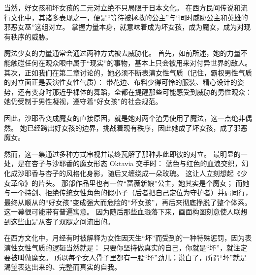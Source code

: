 当然，好女孩和坏女孩的二元对立绝不只局限于日本文化。
在西方民间传说和流行文化中，其诸多表现之一，便是“等待被拯救的公主”与“同时威胁公主和英雄的邪恶女巫”这组对立。
掌握力量本身，就意味着成为坏女孩，成为魔女，成为对现有秩序的威胁。
\cite{ref56}

魔法少女的力量通常会通过两种方式被去威胁化。
首先，如前所述，她的力量不能触碰任何在观众眼中属于“现实”的事物，基本上只会被用来对付异世界的敌人。
其次，正如我们在第二章讨论的，她必须不断表演女性气质（记住，霸权男性气质的对立面正是表演性女性气质）：
带花边、布料少得可怜的服装、精心设计的姿势，还有变身时那近乎裸体的舞蹈，全都在提醒那些可能感受到威胁的男性观众：
她仍受制于男性凝视，遵守着“好女孩”的社会规范。

因此，沙耶香变成魔女的直接原因，就是她对两个渣男使用了魔法，这一点绝非偶然。
她已经跨出好女孩的边界，挑战着现有秩序，因此她成了坏女孩，成了邪恶魔女。

然而，这一集通过多种方式审视并最终瓦解了那种非此即彼的对立。
最明显的一处，是在杏子与沙耶香的魔女形态 Oktavia 交手时：
蓝色与红色的血浪交织，幻化成沙耶香与杏子的风格化身影，随后又缠绕成一朵玫瑰。
这让人立刻想起《少女革命》的片头。
那部作品里也有一位“蔷薇新娘”公主，她其实是个魔女；
而她与一个持剑、拒绝传统女性角色的假小子（后者把自己定位为守护者）并肩同行，最终从顺从的“好女孩”变成强大而危险的“坏女孩”，再后来彻底挣脱了整个体系。
这一幕很可能带有普遍寓意。
因为随后那些血溅落下来，画面构图刻意使人联想到这些血是从杏子双腿之间流出的。


在西方文化中，月经有时被解释为女性因天生“坏”而受到的一种特殊惩罚\cite{ref59}，因为表演性女性气质的逻辑当然就是：
只要你坚持做真实的自己，你就是“坏”，就注定要被叫做魔女。
所以每个女人骨子里都有一股“坏”劲儿；说白了，所谓“坏”就是渴望表达出来的、完整而真实的自我。

